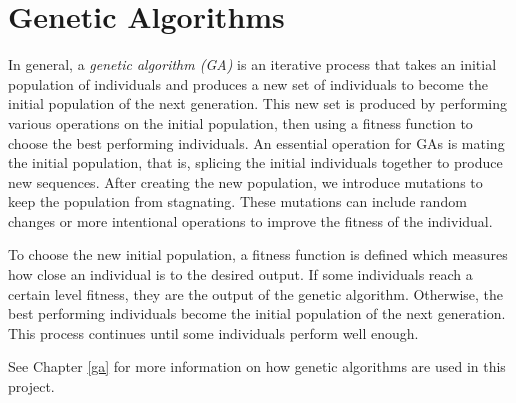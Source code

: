 \section{Genetic Algorithms} \label{bg:ga}

In general, a \textit{genetic algorithm (GA)} is an iterative process that takes an initial population of individuals and produces a new set of individuals to become the initial population of the next generation.
This new set is produced by performing various operations on the initial population, then using a fitness function to choose the best performing individuals.
An essential operation for GAs is mating the initial population, that is, splicing the initial individuals together to produce new sequences.
After creating the new population, we introduce mutations to keep the population from stagnating.
These mutations can include random changes or more intentional operations to improve the fitness of the individual.

To choose the new initial population, a fitness function is defined which measures how close an individual is to the desired output.
If some individuals reach a certain level fitness, they are the output of the genetic algorithm.
Otherwise, the best performing individuals become the initial population of the next generation.
This process continues until some individuals perform well enough.

See Chapter \ref{ga} for more information on how genetic algorithms are used in this project.

